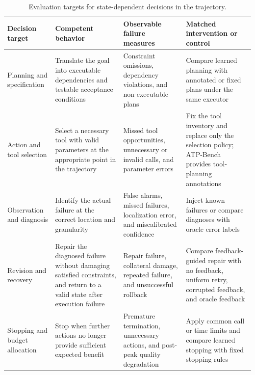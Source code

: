 \begin{table}[t]
  \caption{Evaluation targets for state-dependent decisions in the \AVG{} trajectory.}
  \label{tab:trajectory-evaluation-targets}
  \small
  \begin{tabularx}{\textwidth}{@{}p{}XXX@{}}
    \toprule
    Decision target & Competent behavior & Observable failure measures & Matched intervention or control \\
    \midrule
    Planning and specification & Translate the goal into executable dependencies and testable acceptance conditions & Constraint omissions, dependency violations, and non-executable plans & Compare learned planning with annotated or fixed plans under the same executor \\
    Action and tool selection & Select a necessary tool with valid parameters at the appropriate point in the trajectory & Missed tool opportunities, unnecessary or invalid calls, and parameter errors & Fix the tool inventory and replace only the selection policy; ATP-Bench provides tool-planning annotations~\cite{avg260329902} \\
    Observation and diagnosis & Identify the actual failure at the correct location and granularity & False alarms, missed failures, localization error, and miscalibrated confidence & Inject known failures or compare diagnoses with oracle error labels \\
    Revision and recovery & Repair the diagnosed failure without damaging satisfied constraints, and return to a valid state after execution failure & Repair failure, collateral damage, repeated failure, and unsuccessful rollback & Compare feedback-guided repair with no feedback, uniform retry, corrupted feedback, and oracle feedback \\
    Stopping and budget allocation & Stop when further actions no longer provide sufficient expected benefit & Premature termination, unnecessary actions, and post-peak quality degradation & Apply common call or time limits and compare learned stopping with fixed stopping rules \\
    \bottomrule
  \end{tabularx}
\end{table}
\FloatBarrier

